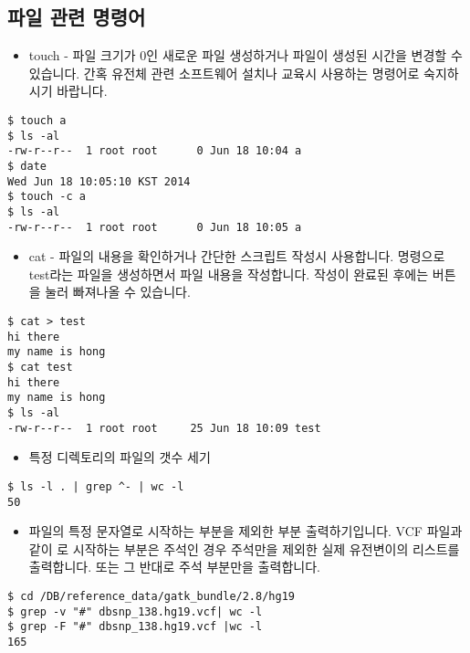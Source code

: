 \documentclass{article}
\begin{document}
\subsection{파일 관련 명령어}

\begin{itemize}
\item
  \begin{itemize}
  touch - 파일 크기가 0인 새로운 파일 생성하거나 파일이 생성된 시간을 변경할 수 있습니다. 간혹 유전체 관련 소프트웨어 설치나 교육시 사용하는 명령어로 숙지하시기 바랍니다.
  \end{itemize}
\end{itemize}
\begin{lstlisting}[frame=single,style=Bash,xleftmargin=1.4cm,xrightmargin=1.4cm]
$ touch a
$ ls -al
-rw-r--r--  1 root root      0 Jun 18 10:04 a
$ date
Wed Jun 18 10:05:10 KST 2014
$ touch -c a
$ ls -al
-rw-r--r--  1 root root      0 Jun 18 10:05 a
\end{lstlisting}

\begin{itemize}
\item
  \begin{itemize}
  cat - 파일의 내용을 확인하거나 간단한 스크립트 작성시 사용합니다.  명령으로 test라는 파일을 생성하면서 파일 내용을 작성합니다. 작성이 완료된 후에는  버튼을 눌러 빠져나올 수 있습니다.
  \end{itemize}
\end{itemize}
\begin{lstlisting}[frame=single,style=Bash,xleftmargin=1.4cm,xrightmargin=1.4cm]
$ cat > test
hi there
my name is hong
$ cat test
hi there
my name is hong
$ ls -al
-rw-r--r--  1 root root     25 Jun 18 10:09 test
\end{lstlisting}

\begin{itemize}
\item
  \begin{itemize}
  특정 디렉토리의 파일의 갯수 세기  
  \end{itemize}
\end{itemize}
\begin{lstlisting}[frame=single,style=Bash,xleftmargin=1.4cm,xrightmargin=1.4cm]
$ ls -l . | grep ^- | wc -l
50
\end{lstlisting}

\begin{itemize}
\item
  \begin{itemize}
  파일의 특정 문자열로 시작하는 부분을 제외한 부분 출력하기입니다. VCF 파일과 같이 \file{#}로 시작하는 부분은 주석인 경우 주석만을 제외한 실제 유전변이의 리스트를 출력합니다. 또는 그 반대로 주석 부분만을 출력합니다.
  \end{itemize}
\end{itemize}
\begin{lstlisting}[frame=single,style=Bash,xleftmargin=1.4cm,xrightmargin=1.4cm]
$ cd /DB/reference_data/gatk_bundle/2.8/hg19
$ grep -v "#" dbsnp_138.hg19.vcf| wc -l
$ grep -F "#" dbsnp_138.hg19.vcf |wc -l
165
\end{lstlisting}
\end{document}
